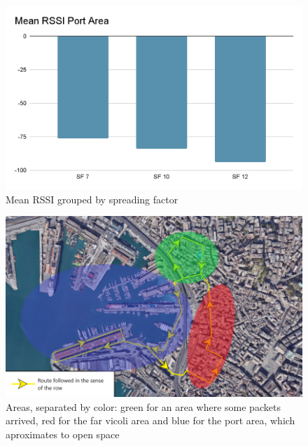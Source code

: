 \begin{figure}[htpb]
\includegraphics[width=\linewidth]{rssiSpreading.png}
\caption{Mean RSSI grouped by spreading factor}
\label{conc:rssiSp}
\end{figure}

\begin{figure}[htpb]
\includegraphics[width=\linewidth]{areasGenova.png}
\caption{Areas, separated by color: green for an area
where some packets arrived, red for the far vicoli area and blue for the port area,
which aproximates to open space}
\label{conc:areasGenova}
\end{figure}
